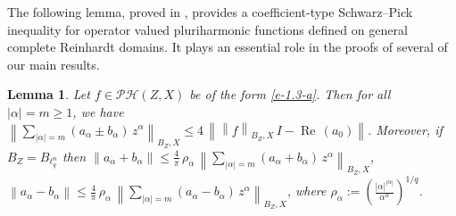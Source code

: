 \documentclass[a4paper,11pt, reqno]{amsart}
\newtheorem{lem}{Lemma}[section]
\theoremstyle{definition}
\newcommand{\real}{{\operatorname{Re}\,}}
\newcommand{\norm}[1]{\left\lVert#1\right\rVert}
\newcommand{\comment}[1]{}
\begin{document}
The following lemma, proved in \cite{Himadri-local-Banach-1}, provides a coefficient-type Schwarz–Pick inequality for operator valued pluriharmonic functions defined on general complete Reinhardt domains. It plays an essential role in the proofs of several of our main results.
	\begin{lem} \label{lem-3.1} \cite{Himadri-local-Banach-1}
		Let $f \in \mathcal{PH}(Z,X)$ be of the form \eqref{e-1.3-a}. Then for all $|\alpha|=m\geq 1$, we have $\norm{\sum_{|\alpha|=m}(a_{\alpha} \pm b_{\alpha})\, z^{\alpha}}_{B_{Z},X} \leq 4 \,\norm{\norm{f}_{B_{Z},X}\,I-\real(a_{0})}$. Moreover, if $B_{Z}=B_{\ell^n_{q}}$ then $\norm{a_{\alpha}+b_{\alpha}}	\leq \frac{4}{\pi} \, \rho_{\alpha}\, \norm{\sum_{|\alpha|=m}(a_{\alpha}+b_{\alpha})\, z^{\alpha}}_{B_{Z},X}$,  $\norm{a_{\alpha}-b_{\alpha}}	\leq \frac{4}{\pi}\,\rho_{\alpha}\, \norm{\sum_{|\alpha|=m}(a_{\alpha}-b_{\alpha})\, z^{\alpha}}_{B_{Z},X}$, where $\rho_{\alpha}:=\left(\frac{|\alpha|^{|\alpha|}}{\alpha^{\alpha}}\right)^{1/q}$.
		\comment{\begin{enumerate}
				\item $\norm{\sum_{|\alpha|=m}(a_{\alpha}+b_{\alpha})\, z^{\alpha}}_{B_{Z},X} \leq 4 \,\gamma_{0} \norm{f}_{B_{Z},X}$,
				$\norm{\sum_{|\alpha|=m}(a_{\alpha}-b_{\alpha})\, z^{\alpha}}_{B_{Z},X} \leq 4 \, \gamma_{0}\, \norm{f}_{B_{Z},X}$;
				\item $\norm{a_{\alpha}+b_{\alpha}}	\leq \frac{4}{\pi} \, \rho_{\alpha}\, \norm{\sum_{|\alpha|=m}(a_{\alpha}+b_{\alpha})\, z^{\alpha}}_{B_{Z},X}$,  $\norm{a_{\alpha}-b_{\alpha}}	\leq \frac{4}{\pi}\,\rho_{\alpha}\, \norm{\sum_{|\alpha|=m}(a_{\alpha}-b_{\alpha})\, z^{\alpha}}_{B_{Z},X}$,
			\end{enumerate}
			where $\gamma_{0}:=\norm{I-\real(a_{0})}$ and $\rho_{\alpha}:=\left(\frac{|\alpha|^{|\alpha|}}{\alpha^{\alpha}}\right)^{\frac{1}{q}}$.}
	\end{lem}
	
\end{document}
